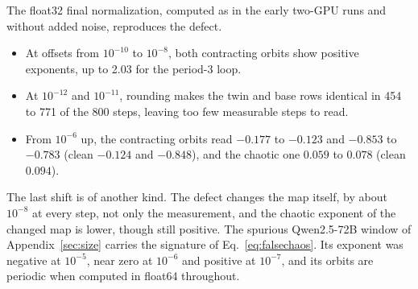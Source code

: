 \documentclass[11pt,letterpaper]{article}
\begin{document}
The float32 final normalization, computed as in the early two-GPU runs and without added noise, reproduces the defect.
\begin{itemize}
  \item At offsets from $10^{-10}$ to $10^{-8}$, both contracting orbits show positive exponents, up to 2.03 for the
  period-3 loop.
  \item At $10^{-12}$ and $10^{-11}$, rounding makes the twin and base rows identical in 454 to 771 of the 800 steps,
  leaving too few measurable steps to read.
  \item From $10^{-6}$ up, the contracting orbits read $-0.177$ to $-0.123$ and $-0.853$ to $-0.783$ (clean $-0.124$ and
  $-0.848$), and the chaotic one $0.059$ to $0.078$ (clean $0.094$).
\end{itemize}
The last shift is of another kind. The defect changes the map itself, by about $10^{-8}$ at every step, not only the
measurement, and the chaotic exponent of the changed map is lower, though still positive. The spurious Qwen2.5-72B
window of Appendix~\ref{sec:size} carries the signature of Eq.~\eqref{eq:falsechaos}. Its exponent was negative at
$10^{-5}$, near zero at $10^{-6}$ and positive at $10^{-7}$, and its orbits are periodic when computed in float64
throughout.
\end{document}
